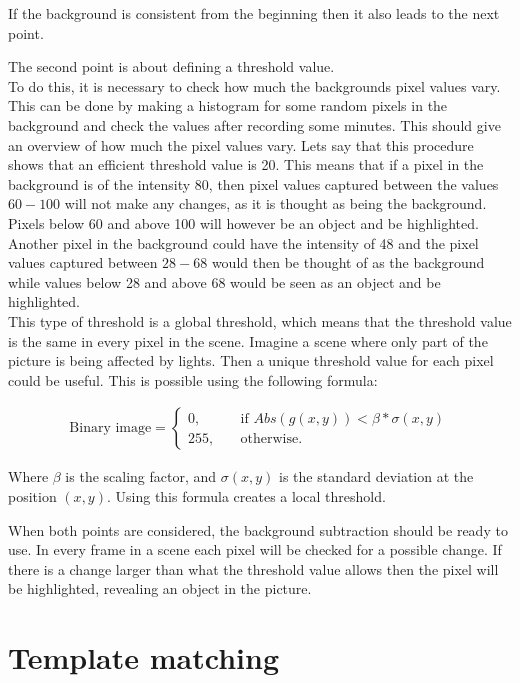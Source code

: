 If the background is consistent from the beginning then it also leads to the next point. 

The second point is about defining a threshold value. \\
To do this, it is necessary to check how much the backgrounds pixel values vary. This can be done by making a histogram for some random pixels in the background and check the values after recording some minutes. This should give an overview of how much the pixel values vary. Lets say that this procedure shows that an efficient threshold value is 20. This means that if a pixel in the background is of the intensity 80, then pixel values captured between the values $60-100$ will not make any changes, as it is thought as being the background. Pixels below 60 and above 100 will however be an object and be highlighted.
Another pixel in the background could have the intensity of 48 and the pixel values captured between $28-68$ would then be thought of as the background while values below 28 and above 68 would be seen as an object and be highlighted. \\
This type of threshold is a global threshold, which means that the threshold value is the same in every pixel in the scene. Imagine a scene where only part of the picture is being affected by lights. Then a unique threshold value for each pixel could be useful. This is possible using the following formula:

\begin{equation}
	\begin{aligned}
  		\ \text{Binary image} = \left\{ \begin{array}{ll}
         0, \quad &\text{if } Abs(g(x,y))<\beta * \sigma(x,y)\\
        255, \quad &\text{otherwise}.
        \end{array} \right . \ 
 	\end{aligned}
\end{equation} 

Where $\beta$ is the scaling factor, and $\sigma(x,y)$ is the standard deviation at the position $(x,y)$. Using this formula creates a local threshold.

When both points are considered, the background subtraction should be ready to use. In every frame in a scene each pixel will be checked for a possible change. If there is a change larger than what the threshold value allows then the pixel will be highlighted, revealing an object in the picture.

\section{Template matching}
